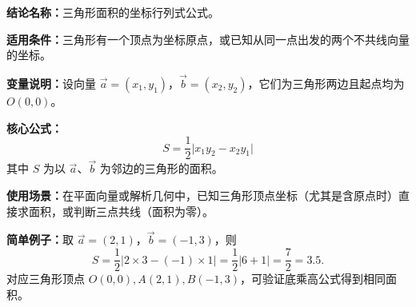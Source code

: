\textbf{结论名称：}三角形面积的坐标行列式公式。

\textbf{适用条件：}三角形有一个顶点为坐标原点，或已知从同一点出发的两个不共线向量的坐标。

\textbf{变量说明：}设向量 $\vec{a}=(x_1,y_1)$，$\vec{b}=(x_2,y_2)$，它们为三角形两边且起点均为 $O(0,0)$。

\textbf{核心公式：}\[
\boxed{S=\frac12\bigl|x_1y_2-x_2y_1\bigr|}
\]
其中 $S$ 为以 $\vec{a}$、$\vec{b}$ 为邻边的三角形的面积。

\textbf{使用场景：}在平面向量或解析几何中，已知三角形顶点坐标（尤其是含原点时）直接求面积，或判断三点共线（面积为零）。

\textbf{简单例子：}取 $\vec{a}=(2,1)$，$\vec{b}=(-1,3)$，则
\[
S=\frac12\bigl|2\times3-(-1)\times1\bigr|=\frac12|6+1|=\frac72=3.5 .
\]
对应三角形顶点 $O(0,0),A(2,1),B(-1,3)$，可验证底乘高公式得到相同面积。